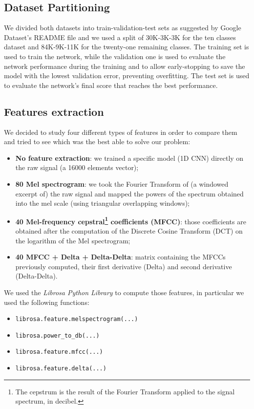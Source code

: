 \documentclass[conference]{IEEEtran}
\begin{document}
\subsection{Dataset Partitioning}
We divided both datasets into train-validation-test sets as suggested by Google Dataset’s README file and we used a split of 30K-3K-3K for the ten classes dataset and 84K-9K-11K for the twenty-one remaining classes. The training set is used to train the network, while the validation one is used to evaluate the network performance during the training and to allow early-stopping to save the model with the lowest validation error, preventing overfitting. The test set is used to evaluate the network’s final score that reaches the best performance.

\subsection{Features extraction}

We decided to study four different types of features in order to compare them and tried to see which was the best able to solve our problem:
\begin{itemize}
\item \textbf{No feature extraction}: we trained a specific model (1D CNN) directly on the raw signal (a 16000 elements vector);
\item \textbf{80 Mel spectrogram}: we took the Fourier Transform of (a windowed excerpt of) the raw signal and mapped the powers of the spectrum obtained into the mel scale (using triangular overlapping windows);
\item \textbf{40 Mel-frequency cepstral\footnote{The cepstrum is the result of the Fourier Transform applied to the signal spectrum, in decibel.} coefficients (MFCC)}: those coefficients are obtained after the computation of the Discrete Cosine Transform (DCT) on the logarithm of the Mel spectrogram;
\item \textbf{40 MFCC + Delta + Delta-Delta}: matrix containing the MFCCs previously computed, their first derivative (Delta) and second derivative (Delta-Delta).
\end{itemize}
We used the \textit{Librosa Python Library} to compute those features, in particular we used the following functions:
\begin{itemize}
\item \texttt{librosa.feature.melspectrogram(...)}
\item \texttt{librosa.power\_to\_db(...)}
\item \texttt{librosa.feature.mfcc(...)}
\item \texttt{librosa.feature.delta(...)}
\end{itemize}
\end{document}
